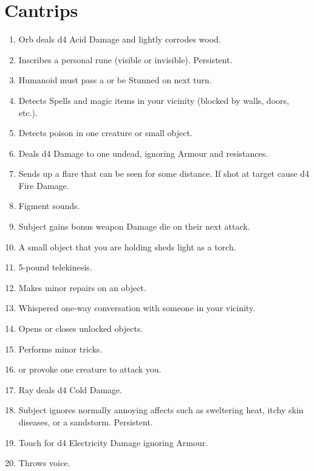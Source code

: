 \documentclass[itdr]{subfiles}
\begin{document}
\section{Cantrips}
\begin{enumerate}
	\item {} Orb deals d4 Acid Damage and lightly corrodes wood.
	\item {} Inscribes a personal rune (visible or invisible). Persistent.
	\item {} Humanoid must pass a  or be Stunned on next turn.
	\item {} Detects Spells and magic items in your vicinity (blocked by walls, doors, etc.).
	\item {} Detects poison in one creature or small object.
	\item {} Deals d4 Damage to one undead, ignoring Armour and resistances.
	\item {} Sends up a flare that can be seen for some distance. If shot at target cause d4 Fire Damage.
	\item {} Figment sounds.
	\item {} Subject gains bonus weapon Damage die on their next attack.
	\item {} A small object that you are holding sheds light as a torch.
	\item {} 5-pound telekinesis.
	\item {} Makes minor repairs on an object.
	\item {} Whispered one-way conversation with someone in your vicinity.
	\item {} Opens or closes unlocked objects.
	\item {} Performs minor tricks.
	\item {}  or provoke one creature to attack you.
	\item {} Ray deals d4 Cold Damage.
	\item {} Subject ignores normally annoying affects such as sweltering heat, itchy skin diseases, or a sandstorm. Persistent.
	\item {} Touch for d4 Electricity Damage ignoring Armour.
	\item {} Throws voice.
\end{enumerate}
\end{document}
